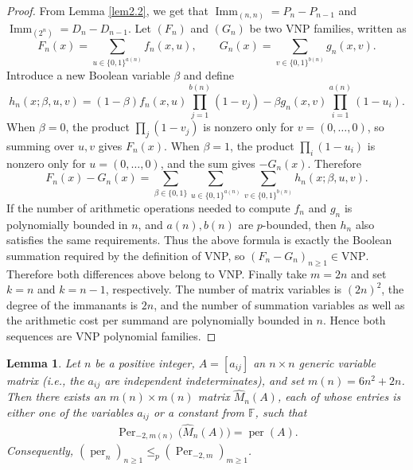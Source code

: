 \documentclass[11pt,a4paper]{article}
\newtheorem{lemma}[theorem]{Lemma}
\begin{document}
\begin{proof}
From Lemma \ref{lem2.2}, we get that $\operatorname{Imm}_{(n,n)}=P_n-P_{n-1}$ and $\operatorname{Imm}_{(2^n)}=D_n-D_{n-1}$.
Let $(F_n)$ and $(G_n)$ be two VNP families, written as
\[
  F_n(x)=\sum_{u\in\{0,1\}^{a(n)}}f_n(x,u),
  \qquad
  G_n(x)=\sum_{v\in\{0,1\}^{b(n)}}g_n(x,v).
\]
Introduce a new Boolean variable $\beta$ and define
\[
  h_n(x;\beta,u,v)
  =(1-\beta)f_n(x,u)\prod_{j=1}^{b(n)}(1-v_j)
  -\beta g_n(x,v)\prod_{i=1}^{a(n)}(1-u_i).
\]
When $\beta=0$, the product $\prod_j(1-v_j)$ is nonzero only for $v=(0,\ldots,0)$, so summing over $u,v$ gives $F_n(x)$.
When $\beta=1$, the product $\prod_i(1-u_i)$ is nonzero only for $u=(0,\ldots,0)$, and the sum gives $-G_n(x)$. Therefore
\[
  F_n(x)-G_n(x)
  =\sum_{\beta\in\{0,1\}}
   \sum_{u\in\{0,1\}^{a(n)}}
   \sum_{v\in\{0,1\}^{b(n)}}h_n(x;\beta,u,v).
\]
If the number of arithmetic operations needed to compute $f_n$ and $g_n$ is polynomially bounded in $n$, and $a(n),b(n)$ are $p$-bounded, then $h_n$ also satisfies the same requirements. Thus the above formula is exactly the Boolean summation required by the definition of VNP, so $(F_n-G_n)_{n\geq1}\in\mathrm{VNP}$.
Therefore both differences above belong to VNP. Finally take $m=2n$ and set $k=n$ and $k=n-1$, respectively. The number of matrix variables is $(2n)^2$, the degree of the immanants is $2n$, and the number of summation variables as well as the arithmetic cost per summand are polynomially bounded in $n$. Hence both sequences are VNP polynomial families.
\end{proof}

\begin{lemma}\label{lem2.6}
Let $n$ be a positive integer, $A=[a_{ij}]$ an $n\times n$ generic variable matrix (i.e., the $a_{ij}$ are independent indeterminates), and set $m(n)=6n^2+2n$. Then there exists an $m(n)\times m(n)$ matrix $\widehat M_n(A)$, each of whose entries is either one of the variables $a_{ij}$ or a constant from $\mathbb{F}$, such that
\begin{eqnarray*}
  \operatorname{Per}_{-2,m(n)}\bigl(\widehat M_n(A)\bigr)=\operatorname{per}(A).
\end{eqnarray*}
Consequently,
$(\operatorname{per}_n)_{n\geq 1}\leq_p(\operatorname{Per}_{-2,m})_{m\geq 1}$.
\end{lemma}
\end{document}
